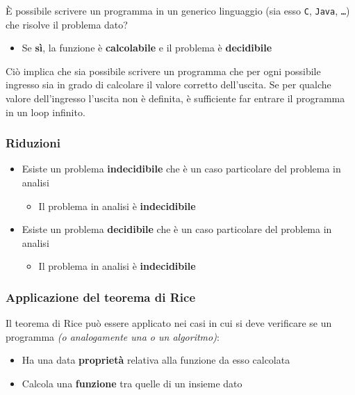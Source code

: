 \documentclass[italian, 10pt]{article}
\begin{document}
È possibile scrivere un programma in un generico linguaggio (sia esso \texttt{C}, \texttt{Java}, \texttt{\ldots}) che risolve il problema dato?

\begin{itemize}[label=\(\Rightarrow\)]
  \item Se \textbf{sì}, la funzione è \textbf{calcolabile} e il problema è \textbf{decidibile}
\end{itemize}

Ciò implica che sia possibile scrivere un programma che per ogni possibile ingresso sia in grado di calcolare il valore corretto dell'uscita.
Se per qualche valore dell'ingresso l'uscita non è definita, è sufficiente far entrare il programma in un loop infinito.

\subsubsection{Riduzioni}

\begin{itemize}
  \item Esiste un problema \textbf{indecidibile} che è un caso particolare del problema in analisi
        \begin{itemize}[label=\(\Rightarrow\)]
          \item Il problema in analisi è \textbf{indecidibile}
        \end{itemize}
  \item Esiste un problema \textbf{decidibile} che è un caso particolare del problema in analisi
        \begin{itemize}[label=\(\Rightarrow\)]
          \item Il problema in analisi è \textbf{indecidibile}
        \end{itemize}
\end{itemize}

\subsubsection{Applicazione del teorema di Rice}

Il teorema di Rice può essere applicato nei casi in cui si deve verificare se un programma \textit{(o analogamente una \TM o un algoritmo)}:

\begin{itemize}
  \item Ha una data \textbf{proprietà} relativa alla funzione da esso calcolata
  \item Calcola una \textbf{funzione} tra quelle di un insieme dato
\end{itemize}
\end{document}
